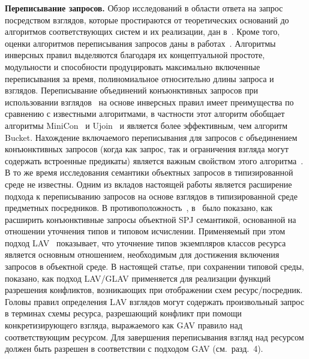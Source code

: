 \begin{multicols}{2}
\noindent
\textbf{Переписывание запросов.} Обзор исследований в области ответа на
запрос посредством взглядов, которые простираются от теоретических оснований до
алгоритмов соответствующих систем и их реализации, дан в~\cite{Hal01}. Кроме того,
оценки алгоритмов переписывания запросов даны в  работах~\cite{Wang02, Gra02}.
Алгоритмы инверсных правил выделяются благодаря их концептуальной
прос\-то\-те, мо\-дуль\-ности и способности продуцировать максимально включенные
переписывания за время, полиномиальное относительно длины запроса и взглядов.
Переписывание объединений конъюнктивных запросов при использовании
взглядов~\cite{Wang02} на основе инверсных правил имеет преимущества по сравнению с
известными алгоритмами, в частности этот алгоритм обобщает алгоритмы
MiniCon~\cite{Pott00} и Ujoin~\cite{Qia96} и является более эффективным, чем алгоритм
Bucket. Нахождение включаемого переписывания для запросов с объединением
конъюнктивных запросов (когда как запрос, так и ограничения взгляда могут содержать
встроенные предикаты) является важным свойством этого алгоритма~\cite{Wang02}. В то
же время исследования семантики объектных запросов в типизированной среде не
известны. Одним из вкладов настоящей работы является расширение подхода к
переписыванию запросов на основе взглядов в типизированной среде предметных
посредников. В противоположность~\cite{Wang02}, в~\cite{KlaMa04} было показано, как
расширить конъюнктивные запросы объектной SPJ семантикой, основанной на
отношении уточнения типов и типовом исчислении. Применяемый при этом подход
LAV~\cite{KlaMa04} показывает, что уточнение типов экземпляров классов ресурса
является основным отношением, необходимым для достижения включения запросов в
объектной среде. В настоящей статье, при сохранении типовой среды, показано, как
подход LAV/GLAV применяется для реализации функций разрешения конфликтов,
возникающих при отображении схем ресурс/посредник. Головы правил определения LAV
взглядов могут содержать произвольный запрос в терминах схемы ресурса, разрешающий
конфликт при помощи конкретизирующего взгляда, выражаемого как GAV правило над
соответствующим ресурсом. Для завершения переписывания взгляд над ресурсом должен
быть разрешен в соответствии с подходом GAV (см.\ разд.~4).

\medskip


\end{multicols}

